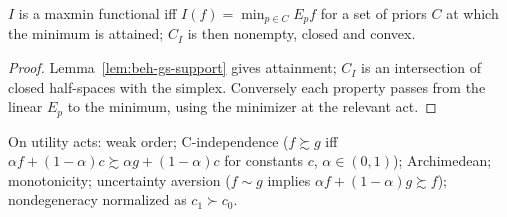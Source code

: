 \begin{theorem}
\label{thm:beh-gs-functional}
\leanok
{}
$I$ is a maxmin functional iff $I(f)=\min_{p\in C}E_pf$ for a set of priors $C$ at which the minimum is attained;
$C_I$ is then nonempty, closed and convex.
\end{theorem}
\begin{proof}
\leanok
Lemma~\ref{lem:beh-gs-support} gives attainment; $C_I$ is an intersection of closed half-spaces with the simplex.
Conversely each property passes from the linear $E_p$ to the minimum, using the minimizer at the relevant act.
\end{proof}

\begin{definition}
\label{def:beh-gs-axioms}
\leanok
On utility acts: weak order; C-independence ($f\succsim g$ iff $\alpha f+(1-\alpha)c\succsim\alpha g+(1-\alpha)c$ for
constants $c$, $\alpha\in(0,1)$); Archimedean; monotonicity; uncertainty aversion ($f\sim g$ implies
$\alpha f+(1-\alpha)g\succsim f$); nondegeneracy normalized as $c_1\succ c_0$.
\end{definition}


